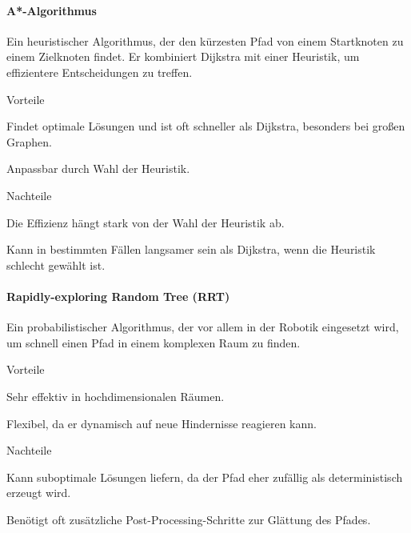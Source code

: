 \documentclass[../main.tex]{subfiles}
\begin{document}
\paragraph{A*-Algorithmus}

Ein heuristischer Algorithmus, der den kürzesten Pfad von einem Startknoten zu einem Zielknoten findet. Er kombiniert Dijkstra mit einer Heuristik, um effizientere Entscheidungen zu treffen.

\begin{minipage}[t]{0.48\textwidth}
\begin{items}
  \item [Vorteile]
  \item Findet optimale Lösungen und ist oft schneller als Dijkstra, besonders bei großen Graphen.
  \item Anpassbar durch Wahl der Heuristik.
\end{items}
\end{minipage}
\hfill
\begin{minipage}[t]{0.48\textwidth}
\begin{items}
  \item [Nachteile]
  \item Die Effizienz hängt stark von der Wahl der Heuristik ab.
  \item Kann in bestimmten Fällen langsamer sein als Dijkstra, wenn die Heuristik schlecht gewählt ist.
\end{items}
\end{minipage}

\paragraph{Rapidly-exploring Random Tree (RRT)}

Ein probabilistischer Algorithmus, der vor allem in der Robotik eingesetzt wird,
um schnell einen Pfad in einem komplexen Raum zu finden.

\begin{minipage}[t]{0.48\textwidth}
\begin{items}
  \item [Vorteile]
  \item Sehr effektiv in hochdimensionalen Räumen.
  \item Flexibel, da er dynamisch auf neue Hindernisse reagieren kann.
\end{items}
\end{minipage}
\hfill
\begin{minipage}[t]{0.48\textwidth}
\begin{items}
  \item [Nachteile]
  \item Kann suboptimale Lösungen liefern, da der Pfad eher zufällig als deterministisch erzeugt wird.
  \item Benötigt oft zusätzliche Post-Processing-Schritte zur Glättung des Pfades.
\end{items}
\end{minipage}
\end{document}
